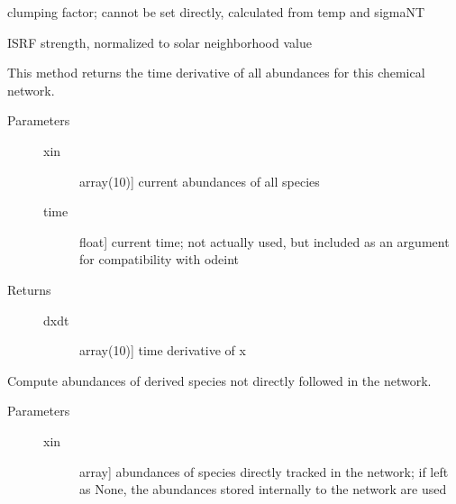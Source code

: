 \documentclass[letterpaper,10pt,english]{sphinxmanual}
\begin{document}
\begin{fulllineitems}
\begin{fulllineitems}
\label{fulldoc:despotic.chemistry.NL99.cfac}
clumping factor; cannot be set directly, calculated from temp
and sigmaNT

\end{fulllineitems}


\begin{fulllineitems}
\label{fulldoc:despotic.chemistry.NL99.chi}
ISRF strength, normalized to solar neighborhood value

\end{fulllineitems}


\begin{fulllineitems}
\label{fulldoc:despotic.chemistry.NL99.dxdt}
This method returns the time derivative of all abundances for
this chemical network.
\begin{description}
\item[{Parameters}] \leavevmode\begin{description}
\item[{xin}] \leavevmode{[}array(10){]}
current abundances of all species

\item[{time}] \leavevmode{[}float{]}
current time; not actually used, but included as an
argument for compatibility with odeint

\end{description}

\item[{Returns}] \leavevmode\begin{description}
\item[{dxdt}] \leavevmode{[}array(10){]}
time derivative of x

\end{description}

\end{description}

\end{fulllineitems}


\begin{fulllineitems}
\label{fulldoc:despotic.chemistry.NL99.extendAbundances}
Compute abundances of derived species not directly followed in
the network.
\begin{description}
\item[{Parameters}] \leavevmode\begin{description}
\item[{xin}] \leavevmode{[}array{]}
abundances of species directly tracked in the network;
if left as None, the abundances stored internally to the
network are used


\end{description}
\end{description}
\end{fulllineitems}
\end{fulllineitems}
\end{document}
